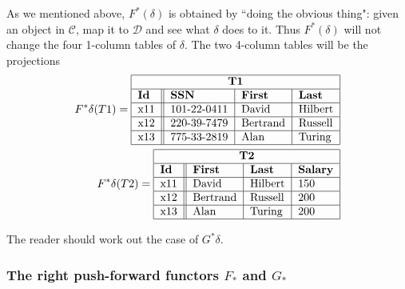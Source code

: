 \documentclass{amsart}
\def\mc{\mathcal}
\def\mcC{\mc{C}}
\def\mcD{\mc{D}}
\theoremstyle{remark}
\theoremstyle{definition}
\begin{document}
As we mentioned above, $F^*(\delta)$ is obtained by ``doing the obvious thing": given an object in $\mcC$, map it to $\mcD$ and see what $\delta$ does to it.  Thus $F^*(\delta)$ will not change the four 1-column tables of $\delta$.  The two 4-column tables will be the projections \begin{align*}F^*\delta(T1)=\begin{tabular}{| l || l | l | l |}\hline\multicolumn{4}{| c |}{\bf T1}\\\hline{\bf Id}&{\bf SSN}&{\bf First}&{\bf Last}\\\hline x11&101-22-0411&David&Hilbert\\\hline x12&220-39-7479&Bertrand&Russell\\\hline x13&775-33-2819&Alan&Turing\\\hline\end{tabular}\\F^*\delta(T2)=\begin{tabular}{| l || l | l | l |}\hline\multicolumn{4}{| c |}{\bf T2}\\\hline{\bf Id}&{\bf First}&{\bf Last}&{\bf Salary}\\\hline x11&David&Hilbert&150\\\hline x12&Bertrand&Russell&200\\\hline x13&Alan&Turing&200\\\hline\end{tabular}\end{align*}

The reader should work out the case of $G^*\delta$.

\subsubsection{The right push-forward functors $F_*$ and $G_*$}\label{sssec:rightpush}
\end{document}
